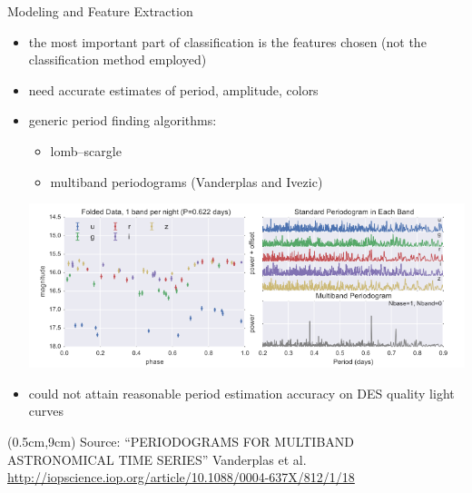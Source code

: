 \documentclass[12pt]{beamer}
\newcommand{\att}[1]{\begin{textblock*}{12cm}(0.5cm,9cm) %
  {\tiny Source: #1}
      \end{textblock*}}
\begin{document}
\begin{frame}{Modeling and Feature Extraction}

  \vspace{-.1in}
  
  \begin{itemize}
  \item the most important part of classification is the features chosen (not the classification method employed)
  \item need accurate estimates of period, amplitude, colors
  \item generic period finding algorithms:
    \begin{itemize}
    \item lomb--scargle
    \item multiband periodograms (Vanderplas and Ivezic)
    \end{itemize}
  \begin{center}
    \includegraphics[scale=0.35]{figs/vanderplas_periodogram.png}
  \end{center}
  \vspace{-.15in}
\item could not attain reasonable period estimation accuracy on DES quality light curves
  \end{itemize}
  
  \att{``PERIODOGRAMS FOR MULTIBAND ASTRONOMICAL TIME SERIES'' Vanderplas et al. \url{http://iopscience.iop.org/article/10.1088/0004-637X/812/1/18}\\}
\end{frame}
\end{document}
